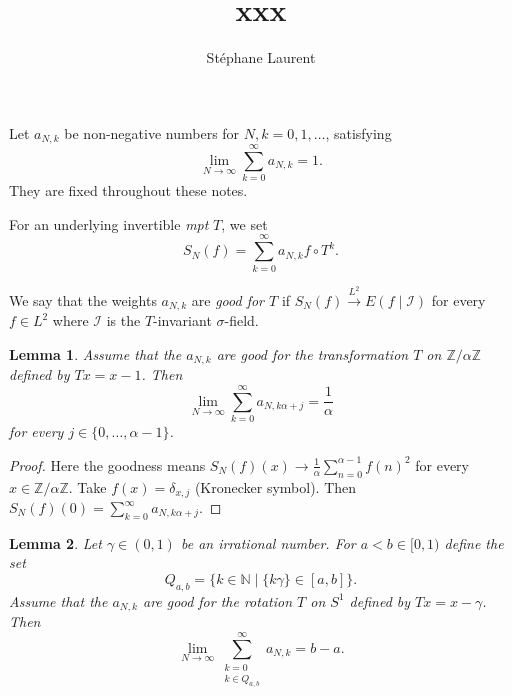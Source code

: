 \documentclass[12pt,a4paper]{article}
\author{Stéphane Laurent}
\title{xxx}
\begin{document}
\theoremstyle{defstyle}
\newtheorem{definition}{Definition}
\newtheorem{remark}{Remark}
\newtheorem{question}{Question}
\newtheorem{clarify}{To clarify}
\theoremstyle{thmstyle}
\newtheorem{thm}{Theorem}[section]
\newtheorem{ppsition}{Proposition}
\newtheorem{lemma}{Lemma}

\newcommand{\FF}{\mathcal{F}}
\newcommand{\GG}{\mathcal{G}}
\newcommand{\EE}{\mathbb{E}}
\newcommand{\II}{\mathcal{I}}
\newcommand{\LL}{\mathcal{L}}
\newcommand{\N}{\mathbb{N}}
\newcommand{\OO}{\mathcal{O}}
\newcommand{\XX}{\mathcal{X}}
\newcommand{\Z}{\mathbb{Z}}
\newcommand{\given}{\mid}
\newcommand{\eps}{\epsilon}
\newcommand{\indic}{\boldsymbol 1}
\newcommand{\Vb}{\boldsymbol V}

\newcommand{\indvee}{\dot{\vee}}
\newcommand{\indep}{\mathrel{\text{\scalebox{1.07}{$\perp\mkern-10mu\perp$}}}}

\maketitle

Let $a_{N,k}$ be non-negative numbers for $N,k = 0, 1, \ldots$, satisfying 
$$
\lim_{N \to \infty} \sum_{k=0}^\infty a_{N,k} =1. 
$$
They are fixed throughout these notes. 

For an underlying invertible \emph{mpt} $T$, we set
$$
S_N(f) = \sum_{k=0}^\infty a_{N,k} f \circ T^k.
$$

We say that the weights $a_{N,k}$ are \emph{good for $T$} if 
$S_N(f) \overset{L^2}{\longrightarrow} E(f \given \II)$ for every 
$f \in L^2$ where $\II$ is the $T$-invariant $\sigma$-field. 

\begin{lemma}
Assume that the $a_{N,k}$ are good for the transformation 
 $T$ on $\Z/\alpha\Z$ defined by $Tx = x - 1$. Then 
$$
\lim_{N \to \infty} \sum_{k=0}^\infty a_{N,k\alpha+j} = \frac{1}{\alpha}
$$
for every $j \in \{0, \ldots, \alpha-1\}$. 
\end{lemma}

\begin{proof}
Here the goodness means $S_N(f)(x) \to \frac{1}{\alpha} \sum_{n=0}^{\alpha-1} {f(n)}^2$ for 
every $x \in \Z/\alpha\Z$. 
Take $f(x) = \delta_{x,j}$ (Kronecker symbol). 
Then $S_N(f)(0) = \sum_{k=0}^\infty a_{N,k\alpha+j}$.
\end{proof}


\begin{lemma}
Let $\gamma \in (0,1)$ be an irrational number. For $a < b \in [0,1)$ define the set  
$$
Q_{a,b} = \bigl\{k \in \N \mid \{k\gamma\} \in [a,b] \bigr\}.  
$$
Assume that the $a_{N,k}$ are good for the rotation  
 $T$ on $S^1$ defined by $Tx = x - \gamma$. 
 Then 
$$
\lim_{N \to \infty} \sum_{\substack{k=0 \\ k \in Q_{a,b}}}^\infty a_{N,k} = b-a.
$$
\end{lemma}
\end{document}
